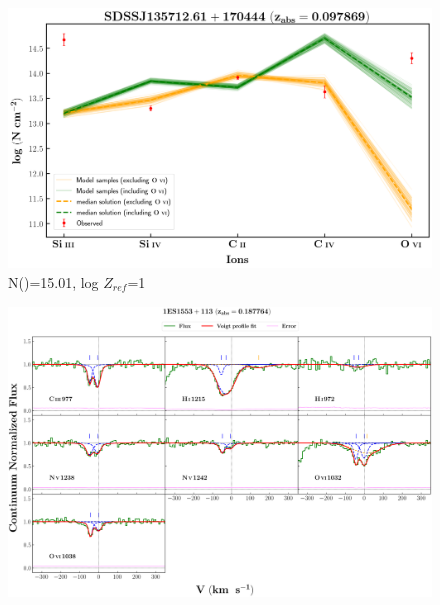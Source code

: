 \documentclass[12pt]{report}
\newcommand\ion[2]{\text{#1\,\textsc{\lowercase{#2}}}}
\begin{document}
\begin{figure}[!h]
    \centering
    \includegraphics[width=0.85\linewidth]{Ionisation-Modelling-Plots/s135712-z=0.097869-compIII_logZ=1.png}
    \caption{N(\ion{H}{i})=15.01, log $Z_{ref}$=1}
\end{figure}



\newpage

\begin{landscape}

\begin{figure}
    \centering
    \vspace{-20mm}
    \hspace*{-35mm}
    \includegraphics[width=1.25\linewidth]{System-Plots/1ES1553+113_z=0.187764_sys_plot.png}
\end{figure}

\end{landscape}
\end{document}
